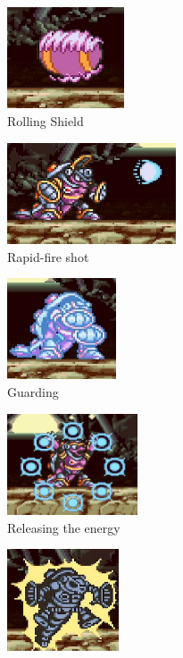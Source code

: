 \begin{figure}[htp]
	\centering
	\begin{subfigure}{0.3\textwidth}
		\centering
		\includegraphics[height=3cm]{figures/X1/Armored_armadillo/Armadillo_rolling.jpg}
		\caption{Rolling Shield}
	\end{subfigure}
	\begin{subfigure}{0.45\textwidth}
		\centering
		\includegraphics[height=3cm]{figures/X1/Armored_armadillo/Armadillo_cannon.jpg}
		\caption{Rapid-fire shot}
	\end{subfigure}	
	\begin{subfigure}{0.35\textwidth}
		\centering
		\includegraphics[height=3cm]{figures/X1/Armored_armadillo/Armadillo_energy_1.jpg}
		\caption{Guarding}
	\end{subfigure}
	\begin{subfigure}{0.35\textwidth}
		\centering
		\includegraphics[height=3cm]{figures/X1/Armored_armadillo/Armadillo_energy_2.jpg}
		\caption{Releasing the energy}
	\end{subfigure}
		\begin{subfigure}{0.35\textwidth}
			\centering
			\includegraphics[height=3cm]{figures/X1/Armored_armadillo/Armadillo_shock_1.jpg}

\end{subfigure}
\end{figure}
